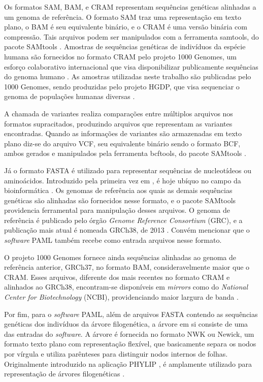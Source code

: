 \documentclass[cic,tc]{iiufrgs}
\begin{document}
Os formatos SAM, BAM, e CRAM representam sequências genéticas alinhadas a um
genoma de referência. O formato SAM traz uma representação em texto plano, o
BAM é seu equivalente binário, e o CRAM é uma versão binária com compressão.
Tais arquivos podem ser manipulados com a ferramenta samtools, do pacote
SAMtools \cite{danecek2021twelve}. Amostras de sequências genéticas de
indivíduos da espécie humana são fornecidos no formato CRAM pelo projeto 1000
Genomes, um esforço colaborativo internacional que visa disponibilizar
publicamente sequências do genoma humano \cite{via20101000}. As amostras
utilizadas neste trabalho são publicadas pelo 1000 Genomes, sendo produzidas
pelo projeto HGDP, que visa sequenciar o genoma de populações humanas diversas
\cite{cavalli2005human}.

A chamada de variantes realiza comparações entre múltiplos arquivos nos
formatos supracitados, produzindo arquivos que representam as variantes
encontradas. Quando as informações de variantes são armazenadas em texto plano
diz-se do arquivo VCF, seu equivalente binário sendo o formato BCF, ambos
gerados e manipulados pela ferramenta bcftools, do pacote
SAMtools \cite{danecek2021twelve}.

Já o formato FASTA é utilizado para representar sequências
de nucleotídeos ou aminoácidos. Introduzido pela primeira vez em
\cite{fasta}, é hoje ubíquo no campo da
bioinformática \cite{shen2016seqkit}. Os genomas de referência aos quais as
demais sequências genéticas são alinhadas são fornecidos nesse formato, e o
pacote SAMtools providencia ferramental para manipulação desses arquivos. O
genoma de referência é publicado pelo órgão \textit{Genome Reference
Consortium} (GRC), e a publicação mais atual é nomeada GRCh38, de
2013 \cite{GUO201783}. Convém mencionar que o \textit{software} PAML também recebe
como entrada arquivos nesse formato.

O projeto 1000 Genomes fornece ainda sequências alinhadas ao genoma de
referência anterior, GRCh37, no formato BAM, consideravelmente maior que o
CRAM. Esses arquivos, diferente dos mais recentes no formato CRAM e alinhados
ao GRCh38, encontram-se disponíveis em \textit{mirrors} como do
\textit{National Center for Biotechnology} (NCBI), providenciando maior largura
de banda \cite{clarke20121000}.

Por fim, para o \textit{software} PAML, além de arquivos FASTA contendo as sequências
genéticas dos indivíduos da árvore filogenética, a árvore em si consiste de uma
das entradas do \textit{software}. A árvore é fornecida no formato NWK ou Newick, um
formato texto plano com representação flexível, que basicamente separa os nodos
por vírgula e utiliza parênteses para distinguir nodos internos de folhas.
Originalmente introduzido na aplicação PHYLIP \cite{felsenstein1993phylip}, é
amplamente utilizado para representação de árvores filogenéticas \cite{fredslund2006phy}.
\end{document}
